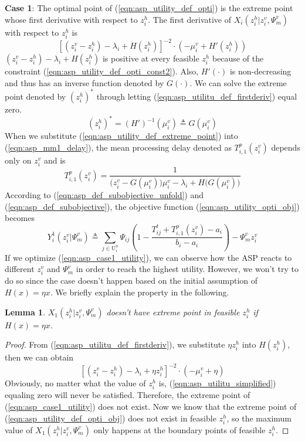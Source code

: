 \documentclass[conference]{IEEEtran}
\newtheorem{lemma}{Lemma}
\begin{document}
\textbf{Case 1}: The optimal point of (\ref{eqn:asp_utility_def_opti}) is the extreme point whose first derivative with respect to $z_i^h$. The first derivative of $X_i(z_i^h|z_i^v,\Psi_m^v)$ with respect to $z_i^h$ is
\begin{equation} \label{eqn:asp_utilitu_def_firstderiv}
[(z_i^v - z_i^h) - \lambda_i + H(z_i^h)]^{-2} \cdot (-\mu_i^v + H'(z_i^h))
\end{equation}
$(z_i^v - z_i^h) - \lambda_i + H(z_i^h)$ is positive at every feasible $z_i^h$ because of the constraint (\ref{eqn:asp_utility_def_opti_const2}). Also, $H'(\cdot)$ is non-decreasing and thus has an inverse function denoted by $G(\cdot)$. We can solve the extreme point denoted by $(z_i^h)^*$ through letting (\ref{eqn:asp_utilitu_def_firstderiv}) equal zero.
\begin{equation} \label{eqn:asp_utility_def_extreme_point}
(z_i^h)^* = (H')^{-1}(\mu_i^v) \triangleq G(\mu_i^v)
\end{equation}
When we substitute (\ref{eqn:asp_utility_def_extreme_point}) into (\ref{eqn:asp_mm1_delay}), the mean processing delay denoted as $T_{i,1}^p(z_i^v)$ depends only on $z_i^v$ and is
\begin{equation}
T_{i,1}^p(z_i^v) = \frac{1}{\big(z_i^v - G(\mu_i^v)\big)\mu_i^v - \lambda_i + H\big(G(\mu_i^v)\big)}
\end{equation}
According to (\ref{eqn:asp_def_subobjective_unfold}) and (\ref{eqn:asp_def_subobjective}), the objective function (\ref{eqn:asp_utility_opti_obj}) becomes
\begin{equation}\label{eqn:asp_case1_utility}
Y_i^1(z_i^v|\Psi_m^v) \triangleq \sum_{j \in \mathrm{U}_i^n}\Psi_{ij}(1-\frac{T_{ij}^t + T_{i,1}^p(z_i^v)-a_i}{b_i-a_i}) - \Psi_m^vz_i^v
\end{equation}
If we optimize (\ref{eqn:asp_case1_utility}), we can observe how the ASP reacts to different $z_i^v$ and $\Psi_m^v$ in order to reach the highest utility. However, we won't try to do so since the case doesn't happen based on the initial assumption of $H(x) = \eta{x}$. We briefly explain the property in the following.
\begin{lemma} \label{lemma:asp_case1_not_exist}
$X_1(z_i^h|z_i^v,\Psi_m^v)$ doesn't have extreme point in feasible $z_i^h$ if $H(x) = \eta{x}$.
\end{lemma}
\begin{proof}
From (\ref{eqn:asp_utilitu_def_firstderiv}),  we substitute $\eta{z_i^h}$ into $H(z_i^h)$, then we can obtain
\begin{equation} \label{eqn:asp_utilitu_simplified}
[(z_i^v - z_i^h) - \lambda_i + \eta{z_i^h}]^{-2} \cdot (-\mu_i^v + \eta)
\end{equation}
Obviously, no matter what the value of $z_i^h$ is, (\ref{eqn:asp_utilitu_simplified}) equaling zero will never be satisfied. Therefore, the extreme point of (\ref{eqn:asp_case1_utility}) does not exist.
Now we know that the extreme point of (\ref{eqn:asp_utility_def_opti_obj}) does not exist in feasible $z_i^h$, so the maximum value of $X_1(z_i^h|z_i^v,\Psi_m^v)$ only happens at the boundary points of feasible $z_i^h$.
\qedhere
\end{proof}
\end{document}
